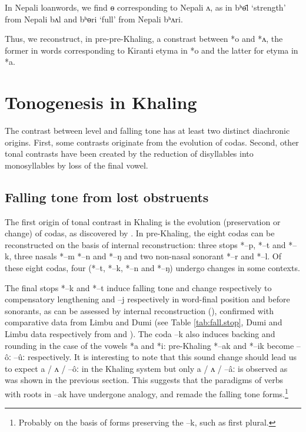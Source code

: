 \documentclass[oldfontcommands,oneside,a4paper,11pt]{article}
\newcommand{\ipa}[1]{{\phon \mbox{#1}}} %
\begin{document}
In Nepali loanwords, we find \ipa{ɵ} corresponding to Nepali  \ipa{ʌ}, as in \ipa{bʰɵ̄l}	`strength' from Nepali \ipa{bʌl} and \ipa{bʰɵri}	`full' from Nepali \ipa{bʰʌri}.

Thus, we reconstruct, in pre-pre-Khaling, a constrast between \ipa{*o} and \ipa{*ʌ}, the former in words corresponding to Kiranti etyma in \ipa{*o} and the latter for etyma in \ipa{*a}.


\section{Tonogenesis in Khaling}
The contrast between level and falling tone has at least two distinct diachronic origins. First, some contrasts originate from the evolution of codas. Second, other tonal contrasts have been created by the reduction of disyllables into monosyllables by loss of the final vowel.


\subsection{Falling tone from lost obstruents} \label{sec:obstruents}
 The first origin of tonal contrast in Khaling is the evolution (preservation or change) of codas, as discovered by \citet{michailovsky75khaling}. In pre-Khaling, the eight codas can be reconstructed on the basis of internal reconstruction: three stops \ipa{*--p}, \ipa{*--t} and \ipa{*--k}, three nasals \ipa{*--m} \ipa{*--n} and \ipa{*--ŋ} and two non-nasal sonorant \ipa{*--r} and \ipa{*--l}. Of these eight codas, four (*--t, \ipa{*--k}, \ipa{*--n} and \ipa{*--ŋ}) undergo changes in some contexts. 


The final stops \ipa{*--k} and \ipa{*--t} induce falling tone and change respectively to compensatory lengthening and \ipa{--j} respectively in word-final position and before sonorants, as can be assessed by internal reconstruction (\citealt{jacques12khaling}), confirmed with comparative data from Limbu and Dumi (see Table \ref{tab:fall.stop}, Dumi and Limbu data respectively from \citealt{driem93dumi} and \citealt{michailovsky02dico}). The coda \ipa{--k} also induces backing and rounding in the case of the vowels \ipa{*a} and \ipa{*i}: pre-Khaling \ipa{*--ak} and \ipa{*--ik} become \ipa{--ôː} \ipa{--ûː} respectively. It is interesting to note that this sound change should lead us to expect \ipa{a} / \ipa{ʌ} / \ipa{--ôː} in the Khaling system but only \ipa{a} / \ipa{ʌ} / \ipa{--âː} is observed as was shown in the previous section. This suggests that the paradigms of verbs with roots in \ipa{--ak} have undergone analogy, and remade the falling tone forms.\footnote{Probably on the basis of forms preserving the \ipa{--k}, such as   first plural.}
\end{document}
